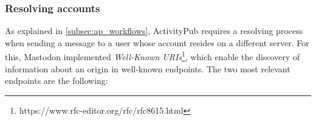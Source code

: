 
\subsubsection{Resolving accounts}
As explained in \ref{subsec:ap_workflows}, ActivityPub requires a resolving process when sending a message to a user whose account resides on a different server. For this, Mastodon implemented \emph{Well-Known URIs}\footnote{https://www.rfc-editor.org/rfc/rfc8615.html}, which enable the discovery of information about an origin in well-known endpoints\cite{nottingham_2019}. The two most relevant endpoints are the following: 

